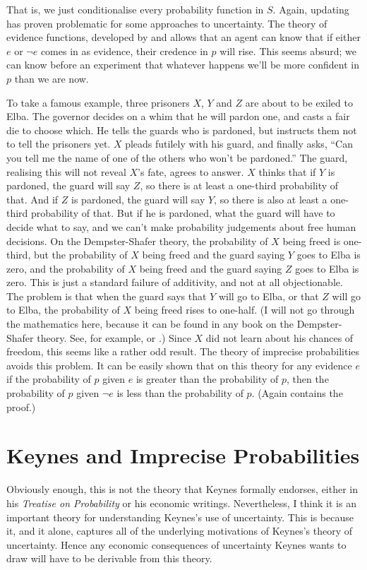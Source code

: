 \noindent That is, we just conditionalise every probability function in \(S\). Again, updating has proven problematic for some approaches to uncertainty. The theory of evidence functions, developed by \citet{Dempster1967} and \citet{Shafer1976} allows that an agent can know that if either \(e\) or \(\neg e\) comes in as evidence, their credence in \(p\) will rise. This seems absurd; we can know before an experiment that whatever happens we'll be more confident in \(p\) than we are now. 

To take a famous example, three prisoners \(X\), \(Y\) and \(Z\) are about to be exiled to Elba. The governor decides on a whim that he will pardon one, and casts a fair die to choose which. He tells the guards who is pardoned, but instructs them not to tell the prisoners yet. \(X\) pleads futilely with his guard, and finally asks, ``Can you tell me the name of one of the others who won't be pardoned.'' The guard, realising this will not reveal \(X\)'s fate, agrees to answer. \(X\) thinks that if \(Y\) is pardoned, the guard will say \(Z\), so there is at least a one-third probability of that. And if \(Z\) is pardoned, the guard will say \(Y\), so there is also at least a one-third probability of that. But if he is pardoned, what the guard will have to decide what to say, and we can't make probability judgements about free human decisions. On the Dempster-Shafer theory, the probability of \(X\) being freed is one-third, but the probability of \(X\) being freed and the guard saying \(Y\) goes to Elba is zero, and the probability of \(X\) being freed and the guard saying \(Z\) goes to Elba is zero. This is just a standard failure of additivity, and not at all objectionable. The problem is that when the guard says that \(Y\) will go to Elba, or that \(Z\) will go to Elba, the probability of \(X\) being freed rises to one-half. (I will not go through the mathematics here, because it can be found in any book on the Dempster-Shafer theory. See, for example, \citet{Walley1991} or \citet{Yager1994}.) Since \(X\) did not learn about his chances of freedom, this seems like a rather odd result. The theory of imprecise probabilities avoids this problem. It can be easily shown that on this theory for any evidence \(e\) if the probability of \(p\) given \(e\) is greater than the probability of \(p\), then the probability of \(p\) given \(\neg e\) is less than the probability of \(p\). (Again \citet{Walley1991} contains the proof.)

\section{Keynes and Imprecise Probabilities}
Obviously enough, this is not the theory that Keynes formally endorses, either in his \textit{Treatise on Probability} \citep{Keynes1921} or his economic writings. Nevertheless, I think it is an important theory for understanding Keynes's use of uncertainty. This is because it, and it alone, captures all of the underlying motivations of Keynes's theory of uncertainty. Hence any economic consequences of uncertainty Keynes wants to draw will have to be derivable from this theory.

